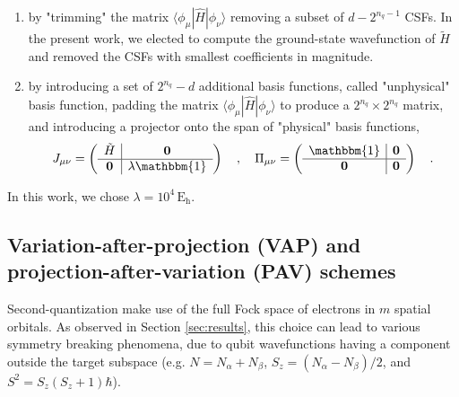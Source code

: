 \documentclass[aps,pra,onecolumn]{revtex4-2}
\begin{document}
\begin{enumerate}
\item by "trimming" the matrix $\langle \phi_\mu | \hat{H} | \phi_\nu \rangle$ removing a subset of $d-2^{n_q-1}$ CSFs. 
In the present work, we elected to compute the ground-state wavefunction of $\tilde{H}$ and removed the CSFs with smallest coefficients in magnitude.
\item by introducing a set of $2^{n_q}-d$ additional basis functions, called "unphysical" basis function, 
padding the matrix $\langle \phi_\mu | \hat{H} | \phi_\nu \rangle$ to produce a $2^{n_q} \times 2^{n_q}$ matrix, 
and introducing a projector onto the span of "physical" basis functions,
\begin{equation}
J_{\mu\nu} = 
\left(
\begin{array}{c|c}
\tilde{H} & {\bf{0}} \\
\hline
{\bf{0}} & \lambda \mathbbm{1} \\
\end{array} 
\right)
\quad,\quad
\Pi_{\mu\nu} =
\left(
\begin{array}{c|c}
\mathbbm{1} & {\bf{0}} \\
\hline
{\bf{0}} & {\bf{0}} \\
\end{array} 
\right)
\quad .
\end{equation}
\end{enumerate}
In this work, we chose $\lambda = 10^4 \, \mathrm{E_h}$.

\subsection{Variation-after-projection (VAP) and projection-after-variation (PAV) schemes}
\label{sec:pav}

Second-quantization make use of the full Fock space of electrons in $m$ spatial orbitals. 
As observed in Section \ref{sec:results}, this choice can lead to various symmetry breaking phenomena, 
due to qubit wavefunctions having a component outside the target subspace (e.g. $N = N_\alpha + N_\beta$, $S_z = (N_\alpha - N_\beta)/2$,
and $S^2 = S_z (S_z+1) \hbar$).
\end{document}
